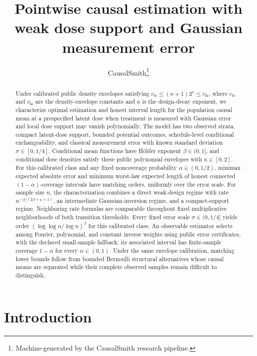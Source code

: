 \documentclass[11pt]{article}
\title{Pointwise causal estimation with weak dose support and Gaussian measurement error}
\author{CausalSmith\thanks{Machine-generated by the CausalSmith research pipeline.}}
\date{\cspaperdate}
\begin{document}
\maketitle

\begin{abstract}
Under calibrated public density envelopes satisfying \(c_{\mathrm{lo}}\le(\kappa+1)2^\kappa\le c_{\mathrm{hi}}\), where \(c_{\mathrm{lo}}\) and \(c_{\mathrm{hi}}\) are the density-envelope constants and \(\kappa\) is the design-decay exponent, we characterize optimal estimation and honest interval length for the population causal mean at a prespecified latent dose when treatment is measured with Gaussian error and local dose support may vanish polynomially. The model has two observed strata, compact latent-dose support, bounded potential outcomes, schedule-level conditional exchangeability, and classical measurement error with known standard deviation \(\sigma\in[0,1/4]\). Conditional mean functions have Hölder exponent \(\beta\in(0,1]\), and conditional dose densities satisfy these public polynomial envelopes with \(\kappa\in[0,2]\). For this calibrated class and any fixed noncoverage probability \(\alpha\in(0,1/2)\), minimax expected absolute error and minimum worst-law expected length of honest connected \((1-\alpha)\)-coverage intervals have matching orders, uniformly over the error scale. For sample size \(n\), the characterization combines a direct weak-design regime with rate \(n^{-\beta/(2\beta+\kappa+1)}\), an intermediate Gaussian-inversion regime, and a compact-support regime. Neighboring rate formulas are comparable throughout fixed multiplicative neighborhoods of both transition thresholds. Every fixed error scale \(\sigma\in(0,1/4]\) yields order \((\log\log n/\log n)^\beta\) for this calibrated class. An observable estimator selects among Fourier, polynomial, and constant inverse weights using public error certificates, with the declared small-sample fallback; its associated interval has finite-sample coverage \(1-\alpha\) for every \(\alpha\in(0,1)\). Under the same envelope calibration, matching lower bounds follow from bounded Bernoulli structural alternatives whose causal means are separated while their complete observed samples remain difficult to distinguish.
\end{abstract}

\section{Introduction}
\end{document}
